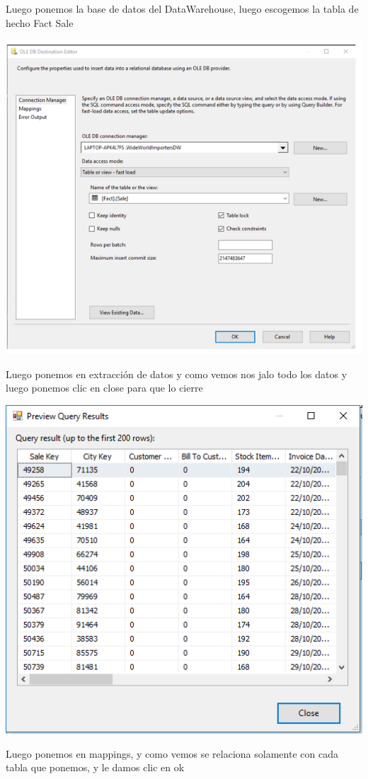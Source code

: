\documentclass[12pt,letterpaper]{article}
\begin{document}
Luego ponemos la base de datos del DataWarehouse, luego escogemos la tabla de hecho Fact Sale\\

\begin{center}
\includegraphics[width=17cm]{IMG/37-m.png} 
\end{center}
Luego ponemos en extracci\'on de datos y como vemos nos jalo todo los datos y luego ponemos clic en close para que lo cierre\\
\begin{center}
\includegraphics[width=17cm]{IMG/39.png} 
\end{center}
Luego ponemos en mappings, y como vemos se relaciona solamente con cada tabla que ponemos, y le damos clic en ok\\
\end{document}

